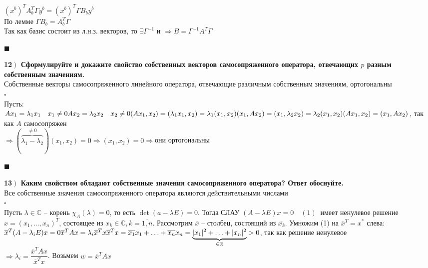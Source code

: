\documentclass[a4paper,12pt]{article}
\begin{document}
$(x^b)^TA_b^T\Gamma y^b=(x^b)^T\Gamma B_by^b$\\
По лемме $\Gamma B_b=A_b^T\Gamma$\\
Так как базис состоит из л.н.з. векторов, то $\exists\Gamma^{-1}$ и $\Rightarrow B=\Gamma^{-1} A^T\Gamma$
\begin{flushright}
	$\blacksquare$
\end{flushright}
\textbf{12$\left.\right)$ Сформулируйте и докажите свойство собственных векторов самосопряженного оператора, отвечающих $p$ разным собственным значениям.}\\
Собственные векторы самосопряженного линейного оператора, отвечающие различным собственным значениям, ортогональны\\
$\square$\\
Пусть:\\ $Ax_1=\lambda_1x_1\quad x_1\ne0\\
Ax_2=\lambda_2x_2\quad x_2\ne0\\
(Ax_1, x_2)=(\lambda_1x_1, x_2)=\lambda_1(x_1, x_2)\\
(x_1, Ax_2)=(x_1, \lambda_2x_2)=\lambda_2(x_1, x_2)\\
(Ax_1, x_2)=(x_1, Ax_2)$, так как $A$ самосопряжен\\
$\Rightarrow(\overbrace{\lambda_1-\lambda_2}^{\ne0})(x_1, x_2)=0\Rightarrow(x_1, x_2)=0\Rightarrow$они ортогональны
\begin{flushright}
	$\blacksquare$
\end{flushright}
\textbf{13$\left.\right)$ Каким свойством обладают собственные значения самосопряженного оператора? Ответ обоснуйте.}\\
Все собственные значения самосопряженного оператора являются действительными числами\\
$\square$\\
Пусть $\lambda\in\mathbb{C}$ -- корень $\chi_A(\lambda)=0$, то есть $\det(a-\lambda E)=0$. Тогда СЛАУ $(A-\lambda E)x=0\quad (1)\ $ имеет ненулевое решение $x=(x_1, \ldots, x_n)^T$, состоящее из $x_k\in\mathbb{C}, k=\overline{1, n}$. Рассмотрим $\overline x$ -- столбец, состоящий из $\overline{x_k}$. Умножим (1) на $\overline x^T=x^*$ слева:\\
$\overline x^T(A-\lambda_iE)x=0\\
\overline x^T Ax=\lambda_i\overline x^Tx\\
\overline x^Tx=\overline{x_1}x_1+\ldots+\overline{x_n}x_n=\underbrace{|x_1|^2+\ldots+|x_n|^2}_{\in\mathbb{R}}>0$, так как решение ненулевое\\
$\Rightarrow \lambda_i=\dfrac{\overline x^TAx}{\overline x^Tx}$. Возьмем $w=\overline x^TAx$\\
\end{document}
